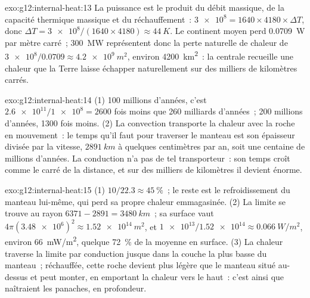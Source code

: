 \begin{solution}{exo:g12:internal-heat:13}
La puissance est le produit du débit massique, de la capacité thermique
massique et du réchauffement~: $\num{3e8} = 1640 \times 4180 \times \Delta T$, donc $\Delta T =
\num{3e8}/(1640 \times 4180) \approx \qty{44}{K}$. Le continent moyen perd
\qty{0.0709}{W} par mètre carré~; \qty{300}{MW} représentent donc la perte
naturelle de chaleur de $\num{3e8}/0.0709 \approx \qty{4.2e9}{m^2}$,
environ \qty{4200}{km^2}~: la centrale recueille une chaleur que la Terre
laisse échapper naturellement sur des milliers de kilomètres carrés.
\end{solution}

\begin{solution}{exo:g12:internal-heat:14}
(1) 100 millions d'années, c'est $\num{2.6e11}/\num{1e8} = 2600$ fois
moins que 260 milliards d'années~; 200 millions d'années, 1300 fois moins.
(2) La convection transporte la chaleur avec la roche en mouvement~: le
temps qu'il faut pour traverser le manteau est son épaisseur divisée par la
vitesse, $\qty{2891}{km}$ à quelques centimètres par an, soit une centaine
de millions d'années. La conduction n'a pas de tel transporteur~: son temps
croît comme le carré de la distance, et sur des milliers de kilomètres il
devient énorme.
\end{solution}

\begin{solution}{exo:g12:internal-heat:15}
(1) $10/22.3 \approx \qty{45}{\percent}$~; le reste est le refroidissement
du manteau lui-même, qui perd sa propre chaleur emmagasinée. (2) La limite
se trouve au rayon $6371 - 2891 =
\qty{3480}{km}$~; sa surface vaut $4\pi (\num{3.48e6})^2 \approx
\qty{1.52e14}{m^2}$, et $\num{1e13}/\num{1.52e14} \approx
\qty{0.066}{W/m^2}$, environ \qty{66}{mW/m^2}, quelque \qty{72}{\percent}
de la moyenne en surface. (3) La chaleur traverse la limite par conduction
jusque dans la couche la plus basse du manteau~; réchauffée, cette roche
devient plus légère que le manteau situé au-dessus et peut monter, en
emportant la chaleur vers le haut~: c'est ainsi que naîtraient les
panaches, en profondeur.
\end{solution}

